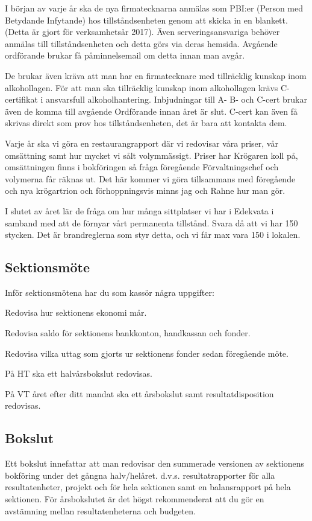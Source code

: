 \documentclass[10pt]{article}
\begin{document}
I början av varje år ska de nya firmatecknarna anmälas som PBI:er (Person med Betydande Infytande) hos tillståndsenheten genom att skicka in en blankett. (Detta är gjort för verksamhetsår 2017). Även serveringsansvariga behöver anmälas till tillståndsenheten och detta görs via deras hemsida. Avgående ordförande brukar få påminnelsemail om detta innan man avgår.

De brukar även kräva att man har en firmatecknare med tillräcklig kunskap inom alkohollagen. För att man ska tillräcklig kunskap inom alkohollagen krävs C-certifikat i ansvarsfull alkoholhantering. Inbjudningar till A- B- och C-cert brukar även de komma till avgående Ordförande innan året är slut. C-cert kan även få skrivas direkt som prov hos tillståndsenheten, det är bara att kontakta dem.

Varje år ska vi göra en restaurangrapport där vi redovisar våra priser, vår omsättning samt hur mycket vi sålt volymmässigt. Priser har Krögaren koll på, omsättningen finns i bokföringen så fråga föregående Förvaltningschef och volymerna får räknas ut. Det här kommer vi göra tillsammans med föregående och nya krögartrion och förhoppningsvis minns jag och Rahne hur man gör.

I slutet av året lär de fråga om hur många sittplatser vi har i Edekvata i samband med att de förnyar vårt permanenta tillstånd. Svara då att vi har 150 stycken. Det är brandreglerna som styr detta, och vi får max vara 150 i lokalen.

\subsection{Sektionsmöte}
Inför sektionsmötena har du som kassör några uppgifter:
\begin{dashlist}
\item Redovisa hur sektionens ekonomi mår.
\item Redovisa saldo för sektionens bankkonton, handkassan och fonder.
\item Redovisa vilka uttag som gjorts ur sektionens fonder sedan föregående möte.
\item På HT ska ett halvårsbokslut redovisas.
\item På VT året efter ditt mandat ska ett årsbokslut samt resultatdisposition redovisas.
\end{dashlist}

\subsection{Bokslut}
Ett bokslut innefattar att man redovisar den summerade versionen av sektionens bokföring under det gångna halv/helåret. d.v.s. resultatrapporter för alla resultatenheter, projekt och för hela sektionen samt en balansrapport på hela sektionen. För årsbokslutet är det högst rekommenderat att du gör en avstämning mellan resultatenheterna och budgeten.
\end{document}

